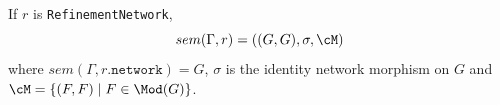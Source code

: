 \documentclass[10pt, a4paper]{isov2}
\newcommand*{\syntax}[1]{\texttt{#1}}
\begin{document}
If $r$ is \syntax{RefinementNetwork},
$$sem(\Gamma, r) = ((G, G), \sigma, \cM)$$
\noindent 
where $sem(\Gamma, r.\syntax{network}) = G$,
$\sigma$ is the identity network morphism on $G$
and 
$\cM = \{ (F, F) \mid F \in \Mod(G)\}$.

%
\end{document}
